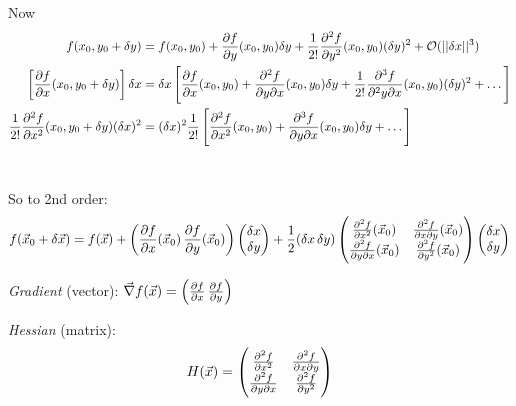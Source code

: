 \documentclass[twoside]{scrartcl}
\begin{document}
Now 
\setlength{\jot}{10pt}
\[
\begin{aligned}
f(x_0, y_0 + \delta y)&= f(x_0,y_0) + \frac{\partial f}{\partial y}(x_0,y_0)\delta y + \frac{1}{2!}\frac{\partial^2f}{\partial y^2}(x_0,y_0)(\delta y)^2 + \mathcal{O}(||\delta x||^3)\\
\left[\frac{\partial f}{\partial x}(x_0,y_0 + \delta y)\right]\delta x &= \delta x\left[\frac{\partial f}{\partial x}(x_0,y_0) + \frac{\partial^2f}{\partial y \partial x}(x_0,y_0)\delta y + \frac{1}{2!}\frac{\partial^3f}{\partial^2y\partial x}(x_0,y_0)(\delta y)^2 + \dots\right]\\
\frac{1}{2!}\frac{\partial^2f}{\partial x^2}(x_0,y_0+\delta y)(\delta x)^2 &= (\delta x)^2\frac{1}{2!}\left[\frac{\partial^2f}{\partial x^2}(x_0,y_0) + \frac{\partial^3f}{\partial y\partial x}(x_0,y_0)\delta y + \dots \right]
\end{aligned}\]~

So to 2nd order:
\[f(\vec{x}_0 + \delta \vec{x}) = f(\vec{x}) + \left(\frac{\partial f}{\partial x}(\vec{x}_0)\,\frac{\partial f}{\partial y}(\vec{x}_0)\right)\begin{pmatrix}
\delta x\\ \delta y	
\end{pmatrix}
+ \frac{1}{2}(\delta x\,\delta y)
\begin{pmatrix}
	\frac{\partial^2f}{\partial x^2}(\vec{x}_0) & \frac{\partial^2f}{\partial x\partial y}(\vec{x}_0)\\
	\frac{\partial^2f}{\partial y\partial x}(\vec{x}_0) & \frac{\partial^2f}{\partial y^2}(\vec{x}_0)
\end{pmatrix}
\begin{pmatrix}
\delta x\\ \delta y	
\end{pmatrix}
\]

\begin{definition}
\emph{Gradient} (vector): $\vec{\nabla}f(\vec{x}) = \left(\frac{\partial f}{\partial x}\, \frac{\partial f}{\partial y}\right)$

\emph{Hessian} (matrix): 
\[H(\vec{x}) = \begin{pmatrix}
	\frac{\partial^2f}{\partial x^2} & \frac{\partial^2f}{\partial x\partial y}\\
	\frac{\partial^2f}{\partial y\partial x} & \frac{\partial^2f}{\partial y^2}
\end{pmatrix}\]
\end{definition}
\end{document}
